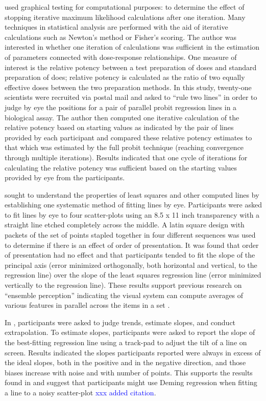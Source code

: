 \documentclass[12pt]{article}
\begin{document}
\citet{finney1951subjective} used graphical testing for computational
purposes: to determine the effect of stopping iterative maximum
likelihood calculations after one iteration. Many techniques in
statistical analysis are performed with the aid of iterative
calculations such as Newton's method or Fisher's scoring. The author was
interested in whether one iteration of calculations was sufficient in
the estimation of parameters connected with dose-response relationships.
One measure of interest is the relative potency between a test
preparation of doses and standard preparation of does; relative potency
is calculated as the ratio of two equally effective doses between the
two preparation methods. In this study, twenty-one scientists were
recruited via postal mail and asked to ``rule two lines'' in order to
judge by eye the positions for a pair of parallel probit regression
lines in a biological assay. The author then computed one iterative
calculation of the relative potency based on starting values as
indicated by the pair of lines provided by each participant and compared
these relative potency estimates to that which was estimated by the full
probit technique (reaching convergence through multiple iterations).
Results indicated that one cycle of iterations for calculating the
relative potency was sufficient based on the starting values provided by
eye from the participants.

\citet{mosteller1981eye} sought to understand the properties of least
squares and other computed lines by establishing one systematic method
of fitting lines by eye. Participants were asked to fit lines by eye to
four scatter-plots using an 8.5 x 11 inch transparency with a straight
line etched completely across the middle. A latin square design with
packets of the set of points stapled together in four different
sequences was used to determine if there is an effect of order of
presentation. It was found that order of presentation had no effect and
that participants tended to fit the slope of the principal axis (error
minimized orthogonally, both horizontal and vertical, to the regression
line) over the slope of the least squares regression line (error
minimized vertically to the regression line). These results support
previous research on ``ensemble perception'' indicating the visual
system can compute averages of various features in parallel across the
items in a set
\citep{chong2003representation, chong2005statistical, van2011rapid}.

In \citet{ciccione2021can}, participants were asked to judge trends,
estimate slopes, and conduct extrapolation. To estimate slopes,
participants were asked to report the slope of the best-fitting
regression line using a track-pad to adjust the tilt of a line on
screen. Results indicated the slopes participants reported were always
in excess of the ideal slopes, both in the positive and in the negative
direction, and those biases increase with noise and with number of
points. This supports the results found in \citet{mosteller1981eye} and
suggest that participants might use Deming regression when fitting a
line to a noisy scatter-plot
\citep{deming1943statistical, linnet1998performance, martin2000general}
{\textcolor{blue}{xxx added citation}}.
\end{document}

